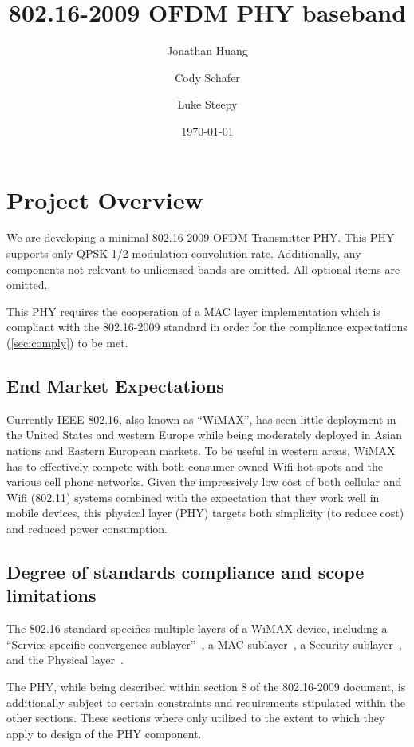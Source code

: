 \documentclass[dvips,10pt,twocolumn]{article}
\title{802.16-2009 OFDM PHY baseband}
\author{Jonathan Huang \and Cody Schafer \and Luke Steepy}
\date{\today}
\begin{document}
\maketitle

\section{Project Overview}
We are developing a minimal 802.16-2009 OFDM Transmitter PHY.  This PHY
supports only QPSK-1/2 modulation-convolution rate. Additionally, any
components not relevant to unlicensed bands are omitted.  All optional items
are omitted.

This PHY requires the cooperation of a MAC layer implementation which is
compliant with the 802.16-2009 standard in order for the compliance
expectations (\autoref{sec:comply}) to be met.

	\subsection{End Market Expectations}
	Currently IEEE 802.16, also known as ``WiMAX'', has seen little
	deployment in the United States and western Europe while being
	moderately deployed in Asian nations and Eastern European markets.
	To be useful in western areas, WiMAX has to effectively compete
	with both consumer owned Wifi hot-spots and the various cell phone
	networks. Given the impressively low cost of both cellular and Wifi
	(802.11) systems combined with the expectation that they work well
	in mobile devices, this physical layer (PHY) targets both
	simplicity (to reduce cost) and reduced power consumption.

	\subsection{Degree of standards compliance and scope limitations}
	\label{sec:comply}
	The 802.16 standard specifies multiple layers of a WiMAX device,
	including a ``Service-specific convergence
	sublayer''~\cite[section 5]{IEEE:802.16}, a MAC
	sublayer~\cite[section 6]{IEEE:802.16}, a Security
	sublayer~\cite[section 7]{IEEE:802.16}, and the Physical
	layer~\cite[section 8]{IEEE:802.16}. 
	
	The PHY, while being described within section 8 of the 802.16-2009
	document, is additionally subject to certain constraints and
	requirements stipulated within the other sections.  These sections
	where only utilized to the extent to which they apply to design of
	the PHY component.
\end{document}

